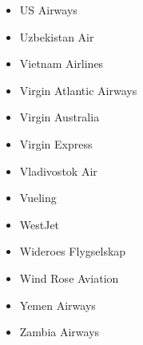 \begin{itemize}
\begin{itemize}
	\item US Airways
	\item Uzbekistan Air
	\item Vietnam Airlines
	\item Virgin Atlantic Airways
	\item Virgin Australia
	\item Virgin Express
	\item Vladivostok Air
	\item Vueling
	\item WestJet
	\item Wideroes Flygselskap
	\item Wind Rose Aviation
	\item Yemen Airways
	\item Zambia Airways
	\end{itemize}
\end{itemize}
%